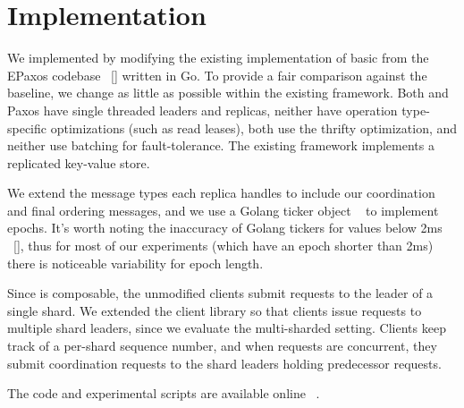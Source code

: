 \section{Implementation}
\label{sec:implementation}
We implemented \protocol by modifying the existing implementation of basic \mpaxos from the EPaxos codebase ~\ref{} written in Go. To provide a fair comparison against the \mpaxos baseline, we change as little as possible within the existing framework. Both \protocol and Paxos have single threaded leaders and replicas, neither have operation type-specific optimizations (such as read leases), both use the thrifty optimization, and neither use batching for fault-tolerance. The existing framework implements a replicated key-value store.

We extend the message types each replica handles to include our coordination and final ordering messages, and we use a Golang ticker object ~\cite{} to implement epochs. It's worth noting the inaccuracy of Golang tickers for values below 2ms ~\ref{}, thus for most of our experiments (which have an epoch shorter than 2ms) there is noticeable variability for epoch length.

Since \sdl is composable, the unmodified \mpaxos clients submit requests to the leader of a single shard. We extended the client library so that clients issue requests to multiple shard leaders, since we evaluate the multi-sharded setting. Clients keep track of a per-shard sequence number, and when requests are concurrent, they submit coordination requests to the shard leaders holding predecessor requests.

The code and experimental scripts are available online ~\cite{}.
